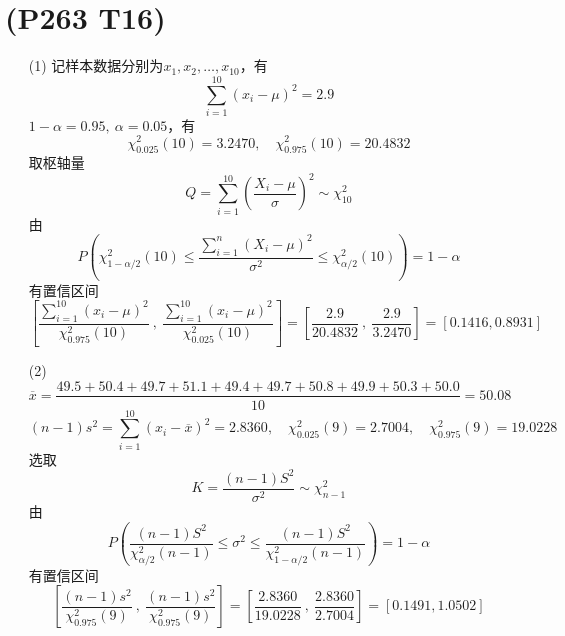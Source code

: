 \documentclass{article}
\begin{document}
\section{(P263 T16)}  %
\begin{enumerate}
    \item [(1)]记样本数据分别为$x_1, x_2, \ldots, x_{10}$，有
    \[
        \sum\limits_{i=1}^{10} {\left(x_i - \mu\right)}^2 = 2.9
    \]
    $1 - \alpha = 0.95,\ \alpha = 0.05$，有
    \[
        \chi_{0.025}^{2} (10) = 3.2470 , \quad
        \chi_{0.975}^{2} (10) = 20.4832
    \]
    取枢轴量
    \[
        Q = \sum\limits_{i=1}^{10} {\left( \frac{X_i - \mu}{\sigma} \right)}^2
        \sim \chi^2_{10} 
    \]
    由
    \[
        P\left(\chi^2_{1 - \alpha / 2} (10) \leq \frac{\sum\limits_{i=1}^{n} {\left(X_i - \mu\right)}^2 }{\sigma^2} \leq \chi^2_{\alpha / 2} (10) \right)    
        = 1 -\alpha
    \]
    有置信区间
    \[
        \left[
            \frac{\sum\limits_{i=1}^{10} {\left(x_i - \mu\right)}^2}{\chi_{0.975}^{2} (10)} 
            \ ,\ 
            \frac{\sum\limits_{i=1}^{10} {\left(x_i - \mu\right)}^2}{\chi_{0.025}^{2} (10)} 
        \right]
        = \left[\frac{2.9}{20.4832}\ ,\ \frac{2.9}{3.2470} \right]
        = [0.1416 , 0.8931]
    \]
    \item [(2)]
    \[
        \overline{x} 
        = \frac{49.5 + 50.4 + 49.7 + 51.1 + 49.4 + 49.7 + 50.8 + 49.9 + 50.3 + 50.0}{10}    
        = 50.08
    \]
    \[
        (n-1) s^2 = \sum\limits_{i=1}^{10} {(x_i - \overline{x})}^2 = 2.8360, \quad
        \chi_{0.025}^{2} (9) = 2.7004, \quad
        \chi_{0.975}^{2} (9) = 19.0228
    \] 
    选取
    \[
        K = \frac{(n-1) S^2}{\sigma^2} \sim \chi^2_{n-1}    
    \]
    由
    \[
        P\left(
            \frac{(n-1)S^2}{\chi^2_{\alpha / 2} (n-1)}       
            \leq \sigma^2 \leq 
            \frac{(n-1)S^2}{\chi^2_{1 - \alpha / 2} (n-1)}  
        \right)    
        = 1 - \alpha
    \]
    有置信区间
    \[
        \left[
            \frac{(n-1) s^2}{\chi_{0.975}^{2} (9)}
            \ ,\ 
            \frac{(n-1) s^2}{\chi_{0.975}^{2} (9)}
        \right]
        = \left[\frac{2.8360}{19.0228}\ ,\ \frac{2.8360}{2.7004}\right]
        = [0.1491 , 1.0502]
    \]
\end{enumerate}
\end{document}
